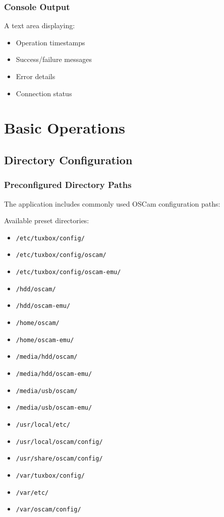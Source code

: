 \documentclass[a4paper,11pt]{report}
\begin{document}
\subsection{Console Output}
A text area displaying:
\begin{itemize}
    \item Operation timestamps
    \item Success/failure messages
    \item Error details
    \item Connection status
\end{itemize}

\chapter{Basic Operations}

\section{Directory Configuration}
\subsection{Preconfigured Directory Paths}
The application includes commonly used OSCam configuration paths:

\begin{procedurebox}
Available preset directories:
\begin{itemize}
    \item \texttt{/etc/tuxbox/config/}
    \item \texttt{/etc/tuxbox/config/oscam/}
    \item \texttt{/etc/tuxbox/config/oscam-emu/}
    \item \texttt{/hdd/oscam/}
    \item \texttt{/hdd/oscam-emu/}
    \item \texttt{/home/oscam/}
    \item \texttt{/home/oscam-emu/}
    \item \texttt{/media/hdd/oscam/}
    \item \texttt{/media/hdd/oscam-emu/}
    \item \texttt{/media/usb/oscam/}
    \item \texttt{/media/usb/oscam-emu/}
    \item \texttt{/usr/local/etc/}
    \item \texttt{/usr/local/oscam/config/}
    \item \texttt{/usr/share/oscam/config/}
    \item \texttt{/var/tuxbox/config/}
    \item \texttt{/var/etc/}
    \item \texttt{/var/oscam/config/}
\end{itemize}
\end{procedurebox}
\end{document}
